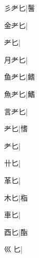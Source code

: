 \begin{multicols}{2}
{{\cjk{}彡耂匕}|{\cjk{}鬐}\par
{\cjk{}金耂匕}\mktsJzrVerticalBar{}{\cjk{}{\cnsym{}　}{\cnsym{}　}{\cnsym{}　}}|{}\par
{耂匕}\mktsJzrVerticalBar{}{\cjk{}{\cnsym{}　}{\cnsym{}　}{\cnsym{}　}}|{}\par
{\cjk{}月耂匕}\mktsJzrVerticalBar{}{\cjk{}{\cnsym{}　}{\cnsym{}　}{\cnsym{}　}}|{}\par
{\cjk{}鱼耂匕}\mktsJzrVerticalBar{}{\cjk{}{\cnsym{}　}{\cnsym{}　}{\cnsym{}　}}|{\cjk{}鳍}\par
{\cjk{}魚耂匕}\mktsJzrVerticalBar{}{\cjk{}{\cnsym{}　}{\cnsym{}　}{\cnsym{}　}}|{\cjk{}鰭}\par
{\cjk{}言耂匕}\mktsJzrVerticalBar{}{\cjk{}{\cnsym{}　}{\cnsym{}　}{\cnsym{}　}}|{}\par
{耂匕}\mktsJzrVerticalBar{}{\cjk{}{\cnsym{}　}{\cnsym{}　}{\cnsym{}　}}|{\cjk{}愭}\par
{耂匕}\mktsJzrVerticalBar{}{\cjk{}{\cnsym{}　}{\cnsym{}　}{\cnsym{}　}}|{}\par
{\cjk{}{\cnsym{}　}卄匕}\mktsJzrVerticalBar{}{\cjk{}{\cnsym{}　}{\cnsym{}　}{\cnsym{}　}}|{}\par
{\cjk{}{\cnsym{}　}革匕}\mktsJzrVerticalBar{}{\cjk{}{\cnsym{}　}{\cnsym{}　}{\cnsym{}　}}|{}\par
{\cjk{}{\cnsym{}　}木匕}\mktsJzrVerticalBar{}{\cjk{}{\cnsym{}　}{\cnsym{}　}{\cnsym{}　}}|{\cjk{}栺}\par
{\cjk{}{\cnsym{}　}車匕}\mktsJzrVerticalBar{}{\cjk{}{\cnsym{}　}{\cnsym{}　}{\cnsym{}　}}|{}\par
{\cjk{}{\cnsym{}　}酉匕}\mktsJzrVerticalBar{}{\cjk{}{\cnsym{}　}{\cnsym{}　}{\cnsym{}　}}|{\cjk{}酯}\par
{\cjk{}巛{\cnxb{}𦣻}匕}\mktsJzrVerticalBar{}{\cjk{}{\cnsym{}　}{\cnsym{}　}{\cnsym{}　}}|{}\par
}
\end{multicols}
